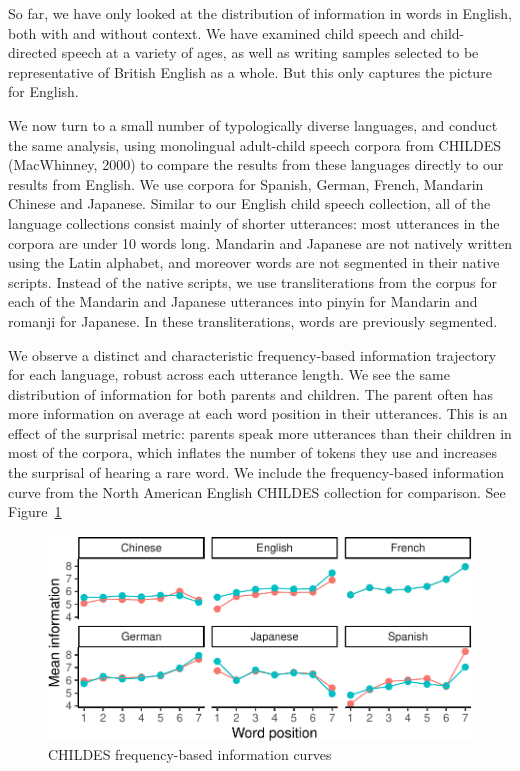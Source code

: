 \documentclass[man,floatsintext]{apa6}
\begin{document}
So far, we have only looked at the distribution of information in words in English, both with and without context. We have examined child speech and child-directed speech at a variety of ages, as well as writing samples selected to be representative of British English as a whole. But this only captures the picture for English.

We now turn to a small number of typologically diverse languages, and conduct the same analysis, using monolingual adult-child speech corpora from CHILDES (MacWhinney, 2000) to compare the results from these languages directly to our results from English. We use corpora for Spanish, German, French, Mandarin Chinese and Japanese. Similar to our English child speech collection, all of the language collections consist mainly of shorter utterances: most utterances in the corpora are under 10 words long. Mandarin and Japanese are not natively written using the Latin alphabet, and moreover words are not segmented in their native scripts. Instead of the native scripts, we use transliterations from the corpus for each of the Mandarin and Japanese utterances into pinyin for Mandarin and romanji for Japanese. In these transliterations, words are previously segmented.

We observe a distinct and characteristic frequency-based information trajectory for each language, robust across each utterance length. We see the same distribution of information for both parents and children. The parent often has more information on average at each word position in their utterances. This is an effect of the surprisal metric: parents speak more utterances than their children in most of the corpora, which inflates the number of tokens they use and increases the surprisal of hearing a rare word. We include the frequency-based information curve from the North American English CHILDES collection for comparison. See Figure~\ref{fig:childes-unigrams}

\begin{figure}
\centering
\includegraphics{figs/childes-unigrams-1.pdf}
\caption{\label{fig:childes-unigrams}CHILDES frequency-based information curves}
\end{figure}
\end{document}

